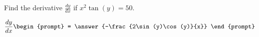 \documentclass{ximera}
\author{Gregory Hartman \and Matthew Carr}
\begin{document}
\begin{exercise}




Find the derivative $\frac{dy}{dx}$ if $x^2\tan(y)=50$.

\[
\frac{dy}{dx}
\begin{prompt}
= \answer{-\frac{2\sin(y)\cos(y)}{x}}
\end{prompt}
\]


\end{exercise}
\end{document}
